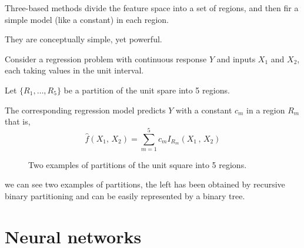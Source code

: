 Three-based methods divide the feature space into a set of regions,
and then fir a simple model (like a constant) in each region.

They are conceptually simple, yet powerful.

\begin{example}{}{}
    Consider a regression problem with continuous response $Y$ and
    inputs $X_1$ and $X_2$, each taking values in the unit interval.

    Let $\{R_1,\dots,R_5\}$ be a partition of the unit spare into 5 regions.

    The corresponding regression model predicts $Y$ with a constant
    $c_m$ in a region $R_m$ that is,
    \begin{equation*}
        \hat{f}(X_1,\,X_2) = \sum_{m=1}^5 c_m I_{R_m}(X_1\,,\,X_2)
    \end{equation*}

\begin{figure}[H]
\hfill
{}
\caption{Two examples of partitions of the unit square into 5 regions.}%
\label{fig:cart}
\end{figure}

 we can see two examples of partitions, the left has been obtained
by recursive binary partitioning and can be easily represented by a binary tree.

\end{example}

\section{Neural networks}
